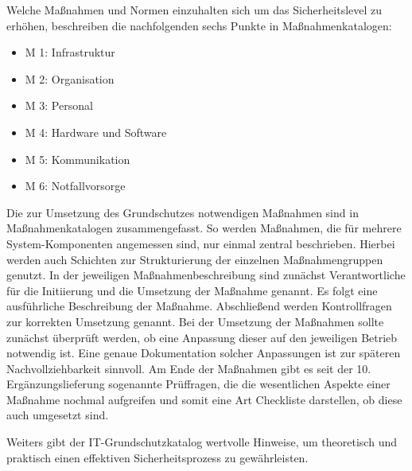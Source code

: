  	Welche Maßnahmen und Normen einzuhalten sich um das Sicherheitslevel zu erhöhen, beschreiben die 
 	nachfolgenden sechs Punkte in Maßnahmenkatalogen: 
 	\begin{itemize}
 		\item M 1: Infrastruktur
 		\item M 2: Organisation
 		\item M 3: Personal
 		\item M 4: Hardware und Software
 		\item M 5: Kommunikation
 		\item M 6: Notfallvorsorge
 	\end{itemize}
 	Die zur Umsetzung des Grundschutzes notwendigen Maßnahmen sind in 
 	Maßnahmenkatalogen zusammengefasst. So werden Maßnahmen, 
 	die für mehrere System-Komponenten angemessen sind, nur einmal zentral beschrieben.
 	Hierbei werden auch Schichten zur Strukturierung der einzelnen Maßnahmengruppen genutzt.
 	In der jeweiligen Maßnahmenbeschreibung sind zunächst Verantwortliche für die Initiierung und 
 	die Umsetzung der Maßnahme genannt. Es folgt eine ausführliche Beschreibung der Maßnahme. 
 	Abschließend werden Kontrollfragen zur korrekten Umsetzung genannt.
 	Bei der Umsetzung der Maßnahmen sollte zunächst überprüft werden, 
 	ob eine Anpassung dieser auf den jeweiligen Betrieb notwendig ist. 
 	Eine genaue Dokumentation solcher Anpassungen ist zur späteren Nachvollziehbarkeit sinnvoll. 
 	Am Ende der Maßnahmen gibt es seit der 10. Ergänzungslieferung sogenannte Prüffragen, 
 	die die wesentlichen Aspekte einer Maßnahme nochmal aufgreifen und somit eine Art Checkliste darstellen,
 	ob diese auch umgesetzt sind.
 	
 	Weiters gibt der IT-Grundschutzkatalog  wertvolle Hinweise, 
 	um theoretisch und praktisch einen effektiven Sicherheitsprozess zu gewährleisten.

